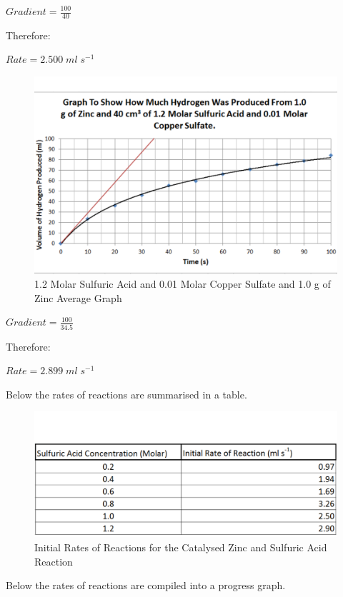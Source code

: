 $Gradient = \frac{100}{40}$

Therefore:

$Rate = 2.500 \; ml \; s^{-1}$

\begin{figure}[H]
    \includegraphics[width=\textwidth]{./Analysis/Images/2Catalysed/12Molar.pdf}
    \caption{1.2 Molar Sulfuric Acid and 0.01 Molar Copper Sulfate and 1.0 g of Zinc Average Graph} \label{fig:12MolarSACSGradient}
\end{figure}

$Gradient = \frac{100}{34.5}$

Therefore:

$Rate = 2.899 \; ml \; s^{-1}$

Below the rates of reactions are summarised in a table.

\begin{figure}[H]
    \includegraphics[width=\textwidth]{./Analysis/Images/2Catalysed/Rates.pdf}
    \caption{Initial Rates of Reactions for the Catalysed Zinc and Sulfuric Acid Reaction} \label{fig:RatesSACS}
\end{figure}

Below the rates of reactions are compiled into a progress graph.

